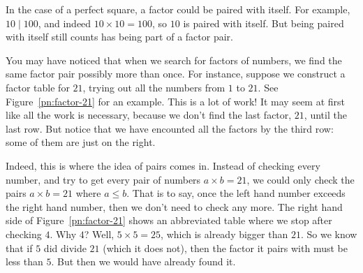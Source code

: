 \documentclass[a4paper,10pt]{report}
\begin{document}
In the case of a perfect square, a factor could be paired with itself. For
example, \(10 \mid 100\), and indeed \(10 \times 10 = 100\), so \(10\) is
paired with itself. But being paired with itself still counts has being part of
a factor pair.

You may have noticed that when we search for factors of numbers, we find the
same factor pair possibly more than once. For instance, suppose we construct a
factor table for \(21\), trying out all the numbers from \(1\) to \(21\). See
Figure~\ref{pn:factor-21} for an example. This is a lot of work! It may seem at
first like all the work is necessary, because we don't find the last factor,
\(21\), until the last row. But notice that we have encounted all the factors
by the third row: some of them are just on the right.

Indeed, this is where the idea of pairs comes in. Instead of checking every
number, and try to get every pair of numbers \(a \times b = 21\), we could only
check the pairs \(a \times b = 21\) where \(a \le b\). That is to say, once the
left hand number exceeds the right hand number, then we don't need to check any
more. The right hand side of Figure~\ref{pn:factor-21} shows an abbreviated
table where we stop after checking \(4\). Why \(4\)? Well, \(5 \times 5 = 25\),
which is already bigger than \(21\). So we know that if \(5\) did divide \(21\)
(which it does not), then the factor it pairs with must be less than \(5\). But
then we would have already found it.
\end{document}
